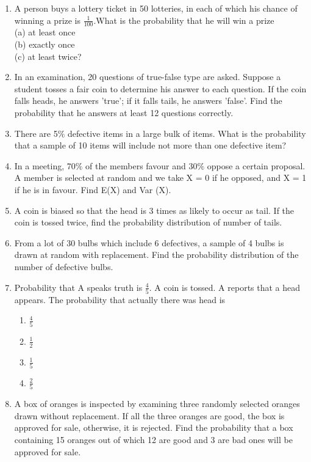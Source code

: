 \begin{enumerate}[label=\thesection.\arabic*.,ref=\thesection.\theenumi]
\item A person buys a lottery ticket in 50 lotteries, in each of which his chance of
winning a prize is $\frac{1}{100}$.What is the probability that he will win a prize\\
(a) at least once \\
(b) exactly once \\
(c) at least twice?\\
\item In an examination, 20 questions of true-false type are asked. Suppose a student tosses a fair coin to determine his answer to each question. If the coin falls heads, he answers 'true'; if it falls tails, he answers 'false'. Find the probability that he answers at least 12 questions correctly.\\
\item There are 5$\%$ defective items in a large bulk of items. What is the probability
that a sample of 10 items will include not more than one defective item?\\
\item In a meeting, 70$\%$ of the members favour and 30$\%$ oppose a certain proposal.
A member is selected at random and we take X = 0 if he opposed, and X = 1 if he is in favour. Find E(X) and Var (X).\\
\item A coin is biased so that the head is 3 times as likely to occur as tail. If the coin is tossed twice, find the probability distribution of number of tails.\\
\item From a lot of 30 bulbs which include 6 defectives, a sample of 4 bulbs is drawn at random with replacement. Find the probability distribution of the number of defective bulbs.\\
\item Probability that A speaks truth is $\frac{4}{5}$. A coin is tossed. A reports that a head appears. The probability that actually there was head is\\
\begin{enumerate}
\item $\frac{4}{5}$
\item $\frac{1}{2}$
\item $\frac{1}{5}$
\item $\frac{2}{5}$
\end{enumerate}
\item A box of oranges is inspected by examining three randomly selected oranges drawn without replacement. If all the three oranges are good, the box is approved for sale, otherwise, it is rejected. Find the probability that a box containing 15 oranges out of which 12 are good and 3 are bad ones will be approved for sale.\\

\end{enumerate}
